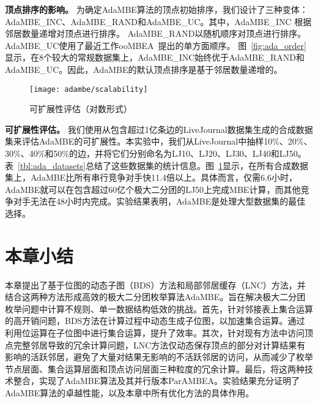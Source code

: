\textbf{顶点排序的影响。} 为确定AdaMBE算法的顶点初始排序，我们设计了三种变体：AdaMBE\_INC、AdaMBE\_RAND和AdaMBE\_UC。其中，AdaMBE\_INC 根据邻居数量递增对顶点进行排序。 AdaMBE\_RAND以随机顺序对顶点进行排序。 AdaMBE\_UC使用了最近工作ooMBEA~\cite{ooMBE22}提出的单方面顺序。 图~\ref{fig:ada_order}显示，在8个较大的常规数据集上，AdaMBE\_INC始终优于AdaMBE\_RAND和AdaMBE\_UC。因此，AdaMBE的默认顶点排序是基于邻居数量递增的。


\begin{figure} [H]
	\centering
		\texttt{[image: adambe/scalability]}
	\caption{可扩展性评估（对数形式）}
	\label{fig:ada_scalability}
\end{figure}


\textbf{可扩展性评估。} 我们使用从包含超过1亿条边的LiveJournal数据集生成的合成数据集来评估AdaMBE的可扩展性。本实验中，我们从LiveJournal中抽样10\%、20\%、30\%、40\%和50\%的边，并将它们分别命名为LJ10、LJ20、LJ30、LJ40和LJ50。表~\ref{tbl:ada_datasets}总结了这些数据集的统计信息。图~\ref{fig:ada_scalability}显示，在所有合成数据集上，AdaMBE比所有串行竞争对手快11.4倍以上。具体而言，仅需6.6小时，AdaMBE就可以在包含超过60亿个极大二分团的LJ50上完成MBE计算，而其他竞争对手无法在48小时内完成。实验结果表明，AdaMBE是处理大型数据集的最佳选择。

\section{本章小结}

本章提出了基于位图的动态子图（BDS）方法和局部邻居缓存（LNC）方法，并结合这两种方法形成高效的极大二分团枚举算法AdaMBE。旨在解决极大二分团枚举问题中计算不规则、单一数据结构低效的挑战。首先，针对邻接表上集合运算的高开销问题，BDS方法在计算过程中动态生成子位图，以加速集合运算。通过利用位运算在子位图中进行集合运算，提升了效率。其次，针对现有方法中访问顶点完整邻居导致的冗余计算问题，LNC方法仅动态保存顶点的部分对计算结果有影响的活跃邻居，避免了大量对结果无影响的不活跃邻居的访问，从而减少了枚举节点层面、集合运算层面和顶点访问层面三种粒度的冗余计算。最后，将这两种技术整合，实现了AdaMBE算法及其并行版本ParAMBEA。实验结果充分证明了AdaMBE算法的卓越性能，以及本章中所有优化方法的具体作用。